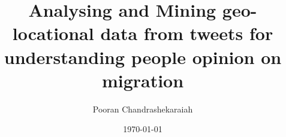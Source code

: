 \documentclass[
    numbers=noenddot,
    parskip=half-,
    fontsize=12pt,
    paper=a4,
    oneside,
    titlepage,
    bibliography=totoc,
    chapterprefix=false,
]{scrbook}
\title{Analysing and Mining geo-locational data from tweets for understanding people opinion on migration}
\author{Pooran Chandrashekaraiah}
\date{\today}
\begin{document}
\frontmatter
%


\tableofcontents
\newpage


\newpage


\newpage

\thispagestyle{empty}
\cleardoublepage
\listoffigures
\newpage

\thispagestyle{empty}
\cleardoublepage
\listoftables
\newpage

\mainmatter








\begin{appendices}
    
\end{appendices}
\newpage


\backmatter

\printbibliography


\end{document}
